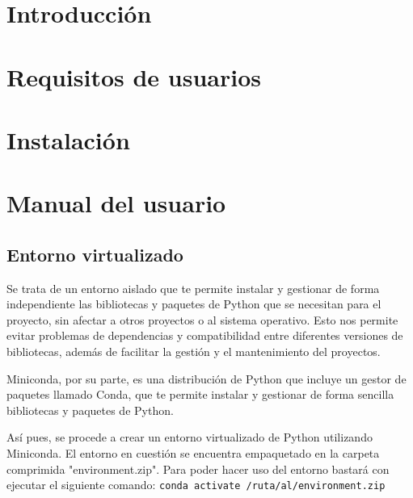 
\section{Introducción}

\section{Requisitos de usuarios}

\section{Instalación}

\section{Manual del usuario}


\subsection{Entorno virtualizado}

Se trata de un entorno aislado que te permite instalar y gestionar de forma independiente las bibliotecas y paquetes de Python que se necesitan para el proyecto, sin afectar a otros proyectos o al sistema operativo. Esto nos permite evitar  problemas de dependencias y compatibilidad entre diferentes versiones de bibliotecas, además de facilitar la gestión y el mantenimiento del proyectos.
 
Miniconda, por su parte, es una distribución de Python que incluye un gestor de paquetes llamado Conda, que te permite instalar y gestionar de forma sencilla bibliotecas y paquetes de Python.

Así pues, se procede a crear un entorno virtualizado de Python utilizando Miniconda. El entorno en cuestión se encuentra empaquetado
en la carpeta comprimida "environment.zip". Para poder hacer uso del
entorno bastará con ejecutar el siguiente comando:
\texttt{conda activate /ruta/al/environment.zip}


